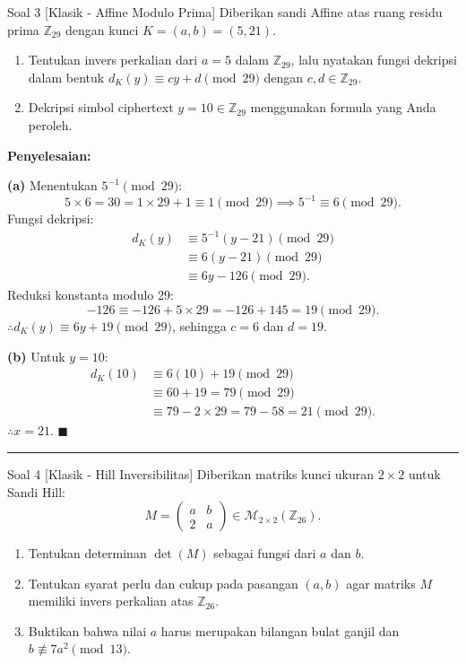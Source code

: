 \documentclass[11pt,a4paper]{article}
\newenvironment{solusi}{\noindent\textbf{\textsf{Penyelesaian:}}\par\vspace{0.2em}}{\hfill$\blacksquare$\vspace{1em}\par\hrule\vspace{1em}}
\begin{document}
\begin{soalklasik}{Soal 3 [Klasik - Affine Modulo Prima]}
Diberikan sandi Affine atas ruang residu prima $\mathbb{Z}_{29}$ dengan kunci $K = (a, b) = (5, 21)$.
\begin{enumerate}[label=(\alph*)]
    \item Tentukan invers perkalian dari $a = 5$ dalam $\mathbb{Z}_{29}$, lalu nyatakan fungsi dekripsi dalam bentuk $d_K(y) \equiv cy + d \pmod{29}$ dengan $c, d \in \mathbb{Z}_{29}$.
    \item Dekripsi simbol ciphertext $y = 10 \in \mathbb{Z}_{29}$ menggunakan formula yang Anda peroleh.
\end{enumerate}
\end{soalklasik}

\begin{solusi}
\textbf{(a)} Menentukan $5^{-1} \pmod{29}$:
\[
5 \times 6 = 30 = 1 \times 29 + 1 \equiv 1 \pmod{29} \implies 5^{-1} \equiv 6 \pmod{29}.
\]
Fungsi dekripsi:
\begin{align*}
d_K(y) &\equiv 5^{-1}(y - 21) \pmod{29} \\
&\equiv 6(y - 21) \pmod{29} \\
&\equiv 6y - 126 \pmod{29}.
\end{align*}
Reduksi konstanta modulo 29:
\[
-126 \equiv -126 + 5 \times 29 = -126 + 145 = 19 \pmod{29}.
\]
$\therefore d_K(y) \equiv 6y + 19 \pmod{29}$, sehingga $c = 6$ dan $d = 19$.

\textbf{(b)} Untuk $y = 10$:
\begin{align*}
d_K(10) &\equiv 6(10) + 19 \pmod{29} \\
&\equiv 60 + 19 = 79 \pmod{29} \\
&\equiv 79 - 2 \times 29 = 79 - 58 = 21 \pmod{29}.
\end{align*}
$\therefore x = 21$.
\end{solusi}

\begin{soalklasik}{Soal 4 [Klasik - Hill Inversibilitas]}
Diberikan matriks kunci ukuran $2 \times 2$ untuk Sandi Hill:
\[
M = \begin{pmatrix} a & b \\ 2 & a \end{pmatrix} \in \mathcal{M}_{2 \times 2}(\mathbb{Z}_{26}).
\]
\begin{enumerate}[label=(\alph*)]
    \item Tentukan determinan $\det(M)$ sebagai fungsi dari $a$ dan $b$.
    \item Tentukan syarat perlu dan cukup pada pasangan $(a, b)$ agar matriks $M$ memiliki invers perkalian atas $\mathbb{Z}_{26}$.
    \item Buktikan bahwa nilai $a$ harus merupakan bilangan bulat ganjil dan $b \not\equiv 7a^2 \pmod{13}$.
\end{enumerate}
\end{soalklasik}
\end{document}
